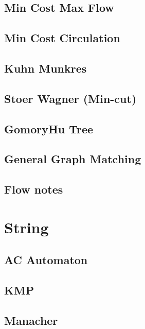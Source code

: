 \subsection{Min Cost Max Flow}

\subsection{Min Cost Circulation}

\subsection{Kuhn Munkres}

\subsection{Stoer Wagner (Min-cut)}

\subsection{GomoryHu Tree}

\subsection{General Graph Matching}

\subsection{Flow notes}
%



\section{String}
\subsection{AC Automaton}

\subsection{KMP}

\subsection{Manacher}

